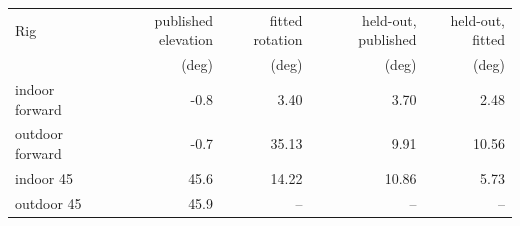 \footnotesize
\begin{tabular}{lrrrr}
\toprule
Rig & published elevation & fitted rotation & held-out, published & held-out, fitted \\
 & (deg) & (deg) & (deg) & (deg) \\
\midrule
indoor forward & -0.8 & 3.40 & 3.70 & 2.48 \\
outdoor forward & -0.7 & 35.13 & 9.91 & 10.56 \\
indoor 45 & 45.6 & 14.22 & 10.86 & 5.73 \\
outdoor 45 & 45.9 & -- & -- & -- \\
\bottomrule
\end{tabular}
